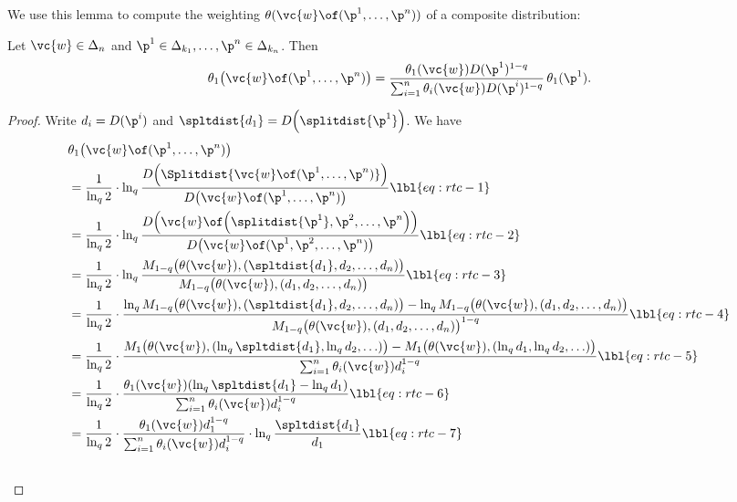We use this lemma to compute the weighting $\theta(\vc{w}\of(\p^1, \ldots,
\p^n))$ of a composite distribution:

\begin{lemma}
Let $\vc{w} \in \Delta_n$ and $\p^1 \in \Delta_{k_1}, \ldots, \p^n \in
\Delta_{k_n}$.  Then
\[
\theta_1\bigl( \vc{w} \of (\p^1, \ldots, \p^n) \bigr)
=
\frac{\theta_1(\vc{w}) D(\p^1)^{1 - q}}%
{\sum_{i = 1}^n \theta_i(\vc{w}) D(\p^i)^{1 - q}}
\,
\theta_1(\p^1).
\]
\end{lemma}

\begin{proof}
Write $d_i = D(\p^i)$ and $\spltdist{d_1} = D\Bigl(\splitdist{\p^1}\Bigr)$.
We have
% 
\begin{align}
&
\theta_1\bigl(\vc{w} \of (\p^1, \ldots, \p^n)\bigr)
\nonumber
\\
&
=
\frac{1}{\ln_q 2} \cdot 
\ln_q 
\frac{D \Bigl(\Splitdist{\vc{w} \of (\p^1, \ldots, \p^n)}\Bigr)}%
{D\bigl( \vc{w} \of (\p^1, \ldots, \p^n)\bigr)}  
\lbl{eq:rtc-1}  \\
&
=
\frac{1}{\ln_q 2} \cdot 
\ln_q 
\frac{D \Bigl(\vc{w} \of 
\Bigl( \splitdist{\p^1}, \p^2, \ldots, \p^n\Bigr)
\Bigr)}%
{D\bigl( \vc{w} \of (\p^1, \p^2, \ldots, \p^n)\bigr)}  
\lbl{eq:rtc-2}  \\
&
=
\frac{1}{\ln_q 2} \cdot 
\ln_q 
\frac{M_{1 - q} \bigl(\theta(\vc{w}),
(\spltdist{d_1}, d_2, \ldots, d_n)
\bigr)}%
{M_{1 - q} \bigl( \theta(\vc{w}), (d_1, d_2, \ldots, d_n)\bigr)}  
\lbl{eq:rtc-3}  \\
&
=
\frac{1}{\ln_q 2} \cdot 
\frac{%
\ln_q M_{1 - q}\bigl(\theta(\vc{w}), (\spltdist{d_1}, d_2, \ldots, d_n)\bigr)
-
\ln_q M_{1 - q}\bigl(\theta(\vc{w}), (d_1, d_2, \ldots, d_n)\bigr)
}%
{M_{1 - q} \bigl( \theta(\vc{w}), (d_1, d_2, \ldots, d_n)\bigr)^{1 - q}}  
\lbl{eq:rtc-4}  \\
&
=
\frac{1}{\ln_q 2} \cdot 
\frac{%
M_1\bigl(
\theta(\vc{w}), (\ln_q \spltdist{d_1}, \ln_q d_2, \ldots)
\bigr)
-
M_1\bigl(
\theta(\vc{w}), (\ln_q d_1, \ln_q d_2, \ldots)
\bigr)
}%
{\sum_{i = 1}^n \theta_i(\vc{w}) d_i^{1 - q}}
\lbl{eq:rtc-5}  \\
&
=
\frac{1}{\ln_q 2} \cdot
\frac{
\theta_1(\vc{w}) (\ln_q \spltdist{d_1} - \ln_q d_1)
}%
{\sum_{i = 1}^n \theta_i(\vc{w}) d_i^{1 - q}}
\lbl{eq:rtc-6}  \\
&
=
\frac{1}{\ln_q 2} \cdot
\frac{
\theta_1(\vc{w}) d_1^{1 - q}
}%
{\sum_{i = 1}^n \theta_i(\vc{w}) d_i^{1 - q}}
\cdot
\ln_q \frac{\spltdist{d_1}}{d_1} 
\lbl{eq:rtc-7}  \\
&

\end{align}
\end{proof}
